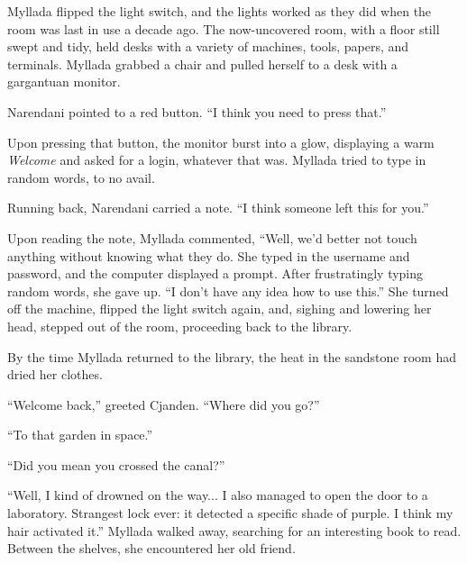 Myllada flipped the light switch, and the lights worked as they did when the room was last in use a decade ago. The now-uncovered room, with a floor still swept and tidy, held desks with a variety of machines, tools, papers, and terminals. Myllada grabbed a chair and pulled herself to a desk with a gargantuan monitor.

Narendani pointed to a red button. ``I think you need to press that.''

Upon pressing that button, the monitor burst into a glow, displaying a warm \emph{Welcome} and asked for a login, whatever that was. Myllada tried to type in random words, to no avail.

Running back, Narendani carried a note. ``I think someone left this for you.''


Upon reading the note, Myllada commented, ``Well, we'd better not touch anything without knowing what they do. She typed in the username and password, and the computer displayed a prompt. After frustratingly typing random words, she gave up. ``I don't have any idea how to use this.'' She turned off the machine, flipped the light switch again, and, sighing and lowering her head, stepped out of the room, proceeding back to the library.

\centeredstars

By the time Myllada returned to the library, the heat in the sandstone room had dried her clothes.

``Welcome back,'' greeted Cjanden. ``Where did you go?''

``To that garden in space.''

``Did you mean you crossed the canal?''

``Well, I kind of drowned on the way... I also managed to open the door to a laboratory. Strangest lock ever: it detected a specific shade of purple. I think my hair activated it.'' Myllada walked away, searching for an interesting book to read. Between the shelves, she encountered her old friend.

